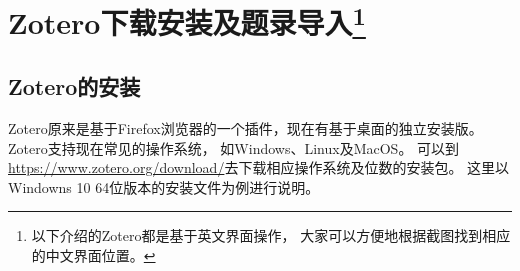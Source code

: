 \documentclass[cn,11pt,chinese]{elegantbook}
\begin{document}
\tableofcontents

\mainmatter
\chapter[Zotero下载安装及题录导入]{Zotero下载安装及题录导入\footnote{以下介绍的Zotero都是基于英文界面操作，
  		大家可以方便地根据截图找到相应的中文界面位置。}}\label{ch:install}
	\section{Zotero的安装} 
		Zotero原来是基于Firefox浏览器的一个插件，现在有基于桌面的独立安装版。Zotero支持现在常见的操作系统，
		如Windows、Linux及MacOS。
		可以到\url{https://www.zotero.org/download/}去下载相应操作系统及位数的安装包。
		这里以Windowns 10 64位版本的安装文件为例进行说明。
\end{document}
